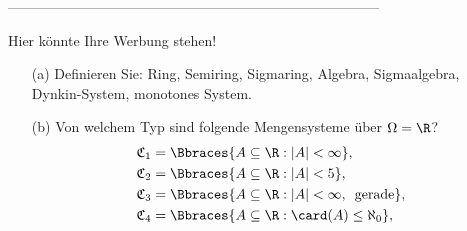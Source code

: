 --------------------------------------------------------------------------------

\begin{exercise}

Hier könnte Ihre Werbung stehen!

\begin{itemize}
  \item[(a)] Definieren Sie: Ring, Semiring, Sigmaring, Algebra, Sigmaalgebra, Dynkin-System, monotones System.
  \item[(b)] Von welchem Typ sind folgende Mengensysteme über $\Omega = \R$?
  \begin{align*}
    \mathfrak{C}_1 & = \Bbraces{A \subseteq \R: |A| < \infty}, \\
    \mathfrak{C}_2 & = \Bbraces{A \subseteq \R: |A| < 5}, \\
    \mathfrak{C}_3 & = \Bbraces{A \subseteq \R: |A| < \infty, \enspace \text{gerade}}, \\
    \mathfrak{C}_4 & = \Bbraces{A \subseteq \R: \card(A) \leq \aleph_0}, \\
  \end{align*}
\end{itemize}

\end{exercise}

